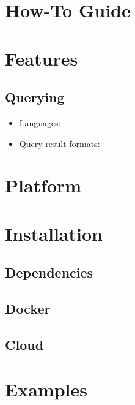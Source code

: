 \documentclass{article}
\begin{document}
\section{How-To Guide}





\section{Features}

\subsection{}


\subsection{}


\subsection{Querying}

\begin{itemize}
    \item Languages:
    
    
    \item Query result formats:
    
    
\end{itemize}

\section{Platform}

\section{Installation}

\subsection{Dependencies}

\subsection{Docker}

\subsection{Cloud}

\section{Examples}
\end{document}
